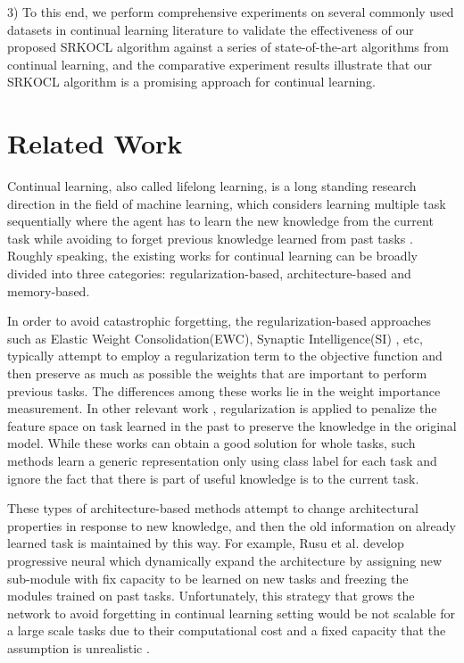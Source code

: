 \documentclass[review]{elsarticle}
\begin{document}
3) To this end, we perform comprehensive experiments on several commonly used datasets in continual learning literature to validate the effectiveness of our proposed SRKOCL algorithm against a series of state-of-the-art algorithms from continual learning, and the comparative experiment results illustrate that our SRKOCL algorithm is a promising approach for continual learning.

\section{Related Work}%

Continual learning, also called lifelong learning, is a long standing research direction in the field of machine learning, which considers learning multiple task sequentially where the agent has to learn the new knowledge from the current task while avoiding to forget previous knowledge learned from past tasks \cite{9parisi2019continual}. Roughly speaking, the existing works for continual learning can be broadly divided into three categories: regularization-based, architecture-based and memory-based.

In order to avoid catastrophic forgetting, the regularization-based approaches such as Elastic Weight Consolidation(EWC)\cite{4kirkpatrick2017overcoming}, Synaptic Intelligence(SI) \cite{5zenke2017continual}, etc, typically attempt to employ a regularization term to the objective function and then preserve as much as possible the weights that are important to perform previous tasks. The differences among these works lie in the weight importance measurement. In other relevant work \cite{6leibe2016computer,11rebuffi2017icarl,12he2020incremental}, regularization is applied to penalize the feature space on task learned in the past to preserve the knowledge in the original model. While these works can obtain a good solution for whole tasks, such methods learn a generic representation only using class label for each task and ignore the fact that there is part of useful knowledge is to the current task. 

These types of architecture-based methods attempt to change architectural properties in response to new knowledge, and then the old information on already learned task is maintained by this way. For example, Rusu et al.\cite{8rusu2016progressive} develop progressive neural which dynamically expand the architecture by assigning new sub-module with fix capacity to be learned on new tasks and freezing the modules trained on past tasks. Unfortunately, this strategy that grows the network to avoid forgetting in continual learning setting would be not scalable for a large scale tasks due to their computational cost and a fixed capacity that the assumption is unrealistic \cite{9parisi2019continual}.
\end{document}
